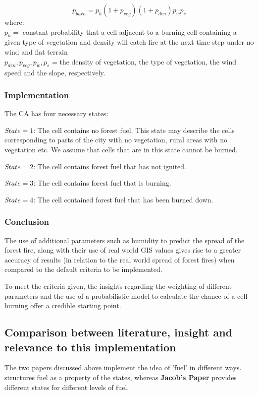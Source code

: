 \documentclass[11pt, a4paper, titlepage]{article}
\begin{document}
    \[ p_{burn} = p_h(1+p_{veg})(1+p_{den})p_wp_s \]
    where: \\
    $p_h = $ constant probability that a cell adjacent to a burning cell containing a given type of vegetation and density will catch fire at the next time step under no wind and flat terrain \\
    $p_{den}, p_{veg}, p_w, p_s$ = the density of vegetation, the type of vegetation, the wind speed and the slope, respectively.



  \subsubsection{Implementation}
  
  The CA has four necessary states:
  
  $State = 1$: The cell contains no forest fuel. This state may describe the cells corresponding to parts of the city with no vegetation, rural areas with no vegetation etc. We assume that cells that are in this state cannot be burned.
  
  $State = 2$: The cell contains forest fuel that has not ignited.
  
  $State = 3$: The cell contains forest fuel that is burning.
  
  $State = 4$: The cell contained forest fuel that has been burned down.
  
  
  \subsubsection{Conclusion}
  The use of additional parameters such as humidity to predict the spread of the forest fire, along with their use of real world GIS values gives rise to a greater accuracy of results (in relation to the real world spread of forest fires) when compared to the default criteria to be implemented.

  To meet the criteria given, the insights regarding the weighting of different parameters and the use of a probabilistic model to calculate the chance of a cell burning offer a credible starting point.

  \subsection{Comparison between literature, insight and relevance to this implementation}
  The two papers discussed above implement the idea of 'fuel' in different ways. \cite{ALEXANDRIDIS2008191} structures fuel as a property of the states, whereas \textbf{Jacob's Paper} provides different states for different levels of fuel. 
  
\end{document}
